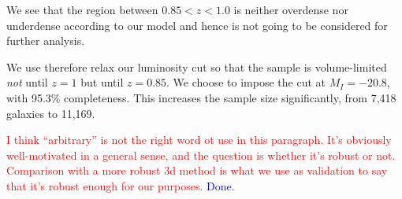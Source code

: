 \documentclass[twocolumn,useAMS,usenatbib]{mn2e}
\newcommand{\rachel}[1]{{\textcolor{red}{#1}}}
\newcommand{\arun}[1]{{\textcolor{blue}{#1}}}
\begin{document}
We see that the region between $0.85<z<1.0$ is neither overdense nor underdense according to our model and hence is not going to be considered for further analysis.

We use therefore relax our luminosity cut %
so that the sample is volume-limited \emph{not} until $z=1$ but until $z=0.85$. 
We choose to impose the cut at $M_I=-20.8$, with 95.3\% completeness. This increases the sample size significantly, from 7,418 galaxies to 11,169.

\rachel{I think ``arbitrary'' is not the right word ot use in this
  paragraph.  It's obviously well-motivated in a general sense, and
  the question is whether it's robust or not.  Comparison with a more
  robust 3d method is what we use as validation to say that it's
  robust enough for our purposes.}
\arun{Done.}
\end{document}

